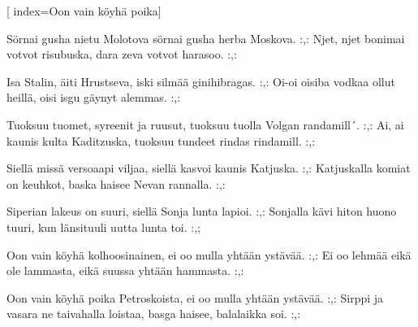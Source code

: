 [ 										
	index={Oon vain köyhä poika}]		
	
\beginverse*						
Sörnai gusha nietu Molotova
sörnai gusha herba Moskova.
:,: Njet, njet bonimai votvot risubuska,
dara zeva votvot harasoo. :,:
\endverse

\beginverse				
Isa Stalin, äiti Hrustseva,
iski silmää ginihibragas.
:,: Oi-oi oisiba vodkaa ollut heillä,
oisi isgu gäynyt alemmas. :,:
\endverse

\beginverse
Tuoksuu tuomet, syreenit ja ruusut, 
tuoksuu tuolla Volgan randamill´.
:,: Ai, ai kaunis kulta Kaditzuska,
tuoksuu tundeet rindas rindamill. :,:
\endverse

\beginverse
Siellä missä versoaapi viljaa, 
siellä kasvoi kaunis Katjuska.
:,: Katjuskalla komiat on keuhkot,
baska haisee Nevan rannalla. :,:
\endverse

\beginverse
Siperian lakeus on suuri,
siellä Sonja lunta lapioi.
:,: Sonjalla kävi hiton huono tuuri,
kun länsituuli uutta lunta toi. :,;
\endverse

\beginverse
Oon vain köyhä kolhoosinainen,
ei oo mulla yhtään ystävää.
:,: Ei oo lehmää eikä ole lammasta,
eikä suussa yhtään hammasta. :,:
\endverse

\beginverse
Oon vain köyhä poika Petroskoista,
ei oo mulla yhtään ystävää. 
:,: Sirppi ja vasara ne taivahalla loistaa,
basga haisee, balalaikka soi. :,:
\endverse		
\endsong		

